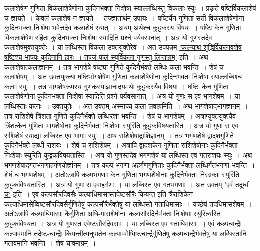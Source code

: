 \documentclass[11pt, openany]{book}
\begin{document}
\newpage

\begin{sloppypar}
\noindent कलाशेषेण गुणिता विकलाशेषेणोना कुदिनभक्ता निःशेषा स्याल्लब्धिस्तु विकलाः स्युः~। प्रकृते षष्टिर्विकलाशेषं च ज्ञायते~। केवलं कलाशेषं न ज्ञायते~। तज्ज्ञातार्थम् उपायः~। षष्टिर्येन गुणिता सती विकलाशेषेणोना कुदिनभक्ता निःशेषा भवेत्तदेव कलाशेषं स्यात्~। अयम् अर्थश्च कुट्टकस्य विषयः~। षष्टिः केन गुणिता विकलाशेषेण रहिता कुदिनभक्ता निःशेषा स्यादिति प्रश्ने पर्यवसानात्~। अत्र यो गुणस्तदेव कलाशेषमुक्तयुक्तेः~। या लब्धिस्ता विकला उक्तयुक्तेरेव~। अत उपपन्नम् \hyperref[5.67]{'कल्प्याथ शुद्धिर्विकलावशेषं षष्टिश्च भाज्यः कुदिनानि हारः~। तज्जं फलं स्युर्विकला गुणस्तु लिप्ताग्रम्'} इति~। अथ कलाशेषात्कलाज्ञानम्~। तत्र भागशेषे षष्ट्या गुणिते कुदिनैर्भक्ते लब्धिः कला भवन्ति~। शेषं च कलाशेषम्~। अत उक्तयुक्त्या षष्टिर्भागशेषेण गुणिता कलाशेषेणोना कुदिनभक्ता निःशेषा स्याल्लब्धिश्च कलाः स्युः~। तत्र भागशेषरूपस्य गुणकस्याज्ञानादयमर्थः कुट्टकस्यैव विषयः~। षष्टिः केन गुणिता कलाशेषेणोना कुदिनभक्ता निःशेषा स्यादिति प्रश्ने पर्यवसानात्~। अत्र यो गुणः स एव भागशेषम्~। या लब्धिस्ताः कलाः~। उक्तयुतेः~। अत उक्तम् अस्माच्च कला-लवाग्रमिति~। अथ भागशेषाद्भागज्ञानम्~। तत्र राशिशेषे त्रिंशता गुणिते कुदिनैर्भक्ते लब्धिरंशा भवन्ति~। शेषं च भागशेषम्~। अत्राप्युक्तयुक्त्यैव त्रिंशत्केन गुणिता भागशेषोनाः कुदिनैर्भक्ता निःशेषाः स्युरिति कुट्टकविषयतास्ति~। अत्र यो गुणः स एव राशिशेषं स्याद्या लब्धिस्त एव भागाः स्युः~। अथ राशिशेषाद्राशिज्ञानम्~। तत्र भगणशेषे द्वादशगुणिते कुदिनैर्भक्ते लब्धी राशयः~। शेषं च राशिशेषम्~। अत्रापि द्वादशकेन गुणिता राशिशेषोनाः कुदिनैर्भक्ता निःशेषाः स्युरिति कुट्टकविषयतास्ति~। अत्र यो गुणस्तदेव भगणशेषं या लब्धिस्त एव गतराशयः स्युः~। अथ भगणशेषाद्गतभगणाहर्गणयोर्ज्ञानम्~। तत्र कल्प-भगणा अहर्गणगुणिताः कुदिनैर्भक्ता लब्धिर्गतभगणा भवन्ति~। शेषं च भगणशेषम्~। अतोऽत्रापि कल्पभगणाः केन गुणिता भगणशेषोनाः कुदिनैर्भक्ता निरग्रकाः स्युरिति कुट्टकविषयतास्ति~। अत्र यो गुणः स एवाहर्गणः~। या लब्धिस्त एव गतभगणाः~। अत उक्तम् \hyperref[5.67]{'एवं तदूर्ध्वं च'} इति~। एवं कल्पसौरदिवसैः कल्पाधिमासास्तदेष्टसौरैः कियन्त इति त्रैराशिकेन कल्पाधिमासेष्विष्टसौरदिवसैर्गुणितेषु कल्पसौरैर्भक्तेषु या लब्धिस्ते गताधिमासाः~। यच्छेषं तदधिमासशेषम्~। अतोऽत्रापि कल्पाधिमासाः कैर्गुणिता अधि-मासशेषोनाः कलासौरदिनैर्भक्ता निःशेषाः स्युरित्यस्ति कुट्टकविषयता~। अत्र यो गुणस्त एवेष्टसौरदिवसाः~। या लब्धिस्त एव गताधिमासाः~। एवं कल्पचान्द्रैः कल्पावमानि तदेष्ट-चान्द्रैः कियन्तीत्यनुपातेन कल्पावमेष्विष्टचान्द्रैर्गुणितेषु कल्पचान्द्रैर्भक्तेषु या लब्धिस्तानि गतावमानि भवन्ति~। शेषं चावमाग्रम्~।
\end{sloppypar}

\newpage
\end{document}
